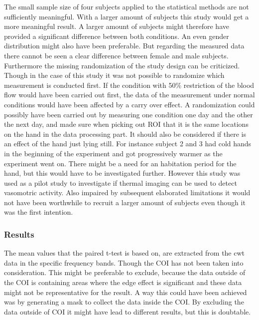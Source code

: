 The small sample size of four subjects applied to the statistical methods are not sufficiently meaningful. With a larger amount of subjects this study would get a more meaningful result. A larger amount of subjects might therefore have provided a significant difference between both conditions. An even gender distribution might also have been preferable. But regarding the measured data there cannot be seen a clear difference between female and male subjects.
Furthermore the missing randomization of the study design can be criticized. Though in the case of this study it was not possible to randomize which measurement is conducted first. If the condition with 50\% restriction of the blood flow would have been carried out first, the data of the measurement under normal conditions would have been affected by a carry over effect. A randomization could possibly have been carried out by measuring one condition one day and the other the next day, and made sure when picking out ROI that it is the same locations on the hand in the data processing part. It should also be considered if there is an effect of the hand just lying still. For instance subject 2 and 3 had cold hands in the beginning of the experiment and got progressively warmer as the experiment went on. There might be a need for an habitation period for the hand, but this would have to be investigated further. 
However this study was used as a pilot study to investigate if thermal imaging can be used to detect vasomotric activity. Also impaired by subsequent elaborated limitations it would not have been worthwhile to recruit a larger amount of subjects even though it was the first intention.

\subsubsection{Results}
The mean values that the paired t-test is based on, are extracted from the cwt data in the specific frequency bands. Though the COI has not been taken into consideration. This might be preferable to exclude, because the data outside of the COI is containing areas where the edge effect is significant and these data might not be representative for the result. A way this could have been achieved was by generating a mask to collect the data inside the COI. By excluding the data outside of COI it might have lead to different results, but this is doubtable. 

